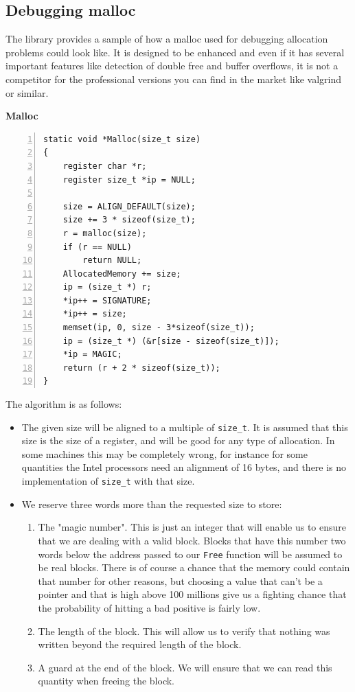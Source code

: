 \documentclass[12pt,a4paper,openany]{memoir} %
\newif\iftth
\newcommand{\container}{}
\newcommand{\function}[1] {%
\vspace{0.2in}
\par\noindent
\textbf{#1}\index{#1!code for \container} \hrulefill
\iftth\else
\nopagebreak
\fi
\noindent\begin{Verbatim}[numbers=left, xleftmargin=7mm]}
\begin{document}
{{\subsection{Debugging malloc}
\label{Malloc}
\renewcommand{\container}{debugMalloc}
The library provides a sample of how a malloc used for debugging allocation problems could look like. It is designed to be enhanced and even if it
has several important features like detection of double free and buffer overflows, it is not a competitor for the professional versions you can find
in the market like valgrind or similar.
\function{Malloc}
static void *Malloc(size_t size)
{
    register char *r;
    register size_t *ip = NULL;

    size = ALIGN_DEFAULT(size);
    size += 3 * sizeof(size_t);
    r = malloc(size);
    if (r == NULL)
        return NULL;
    AllocatedMemory += size;
    ip = (size_t *) r;
    *ip++ = SIGNATURE;
    *ip++ = size;
    memset(ip, 0, size - 3*sizeof(size_t));
    ip = (size_t *) (&r[size - sizeof(size_t)]);
    *ip = MAGIC;
    return (r + 2 * sizeof(size_t));
}
\end{Verbatim}
The algorithm is as follows:
\begin{itemize}
\item The given size will be aligned to a multiple of \texttt{size\_t}. It is assumed that this size is the size of a register, and will be 
good for any type of allocation. In some machines this may be completely wrong, for instance for some quantities the Intel processors need an
alignment of 16 bytes, and there is no implementation of \texttt{size\_t} with that size.
\item We reserve three words more than the requested size to store:
\begin{enumerate}
\item The "magic number". This is just an integer that will enable us to ensure that we are dealing with a valid block. Blocks that have this number two 
words below the address passed to our \texttt{Free} function will be assumed to be real blocks. There 
is of course a chance that the memory
could contain that number for other reasons, but choosing a value that can't be a pointer and that is high above 100 millions give us a fighting chance 
that the
probability of hitting a bad positive is fairly low.
\item The length of the block. This will allow us to verify that nothing was written beyond the required length of the block.
\item A guard at the end of the block. We will ensure that we can read this quantity when freeing the block.

\end{enumerate}
\end{itemize}}}
\end{document}
